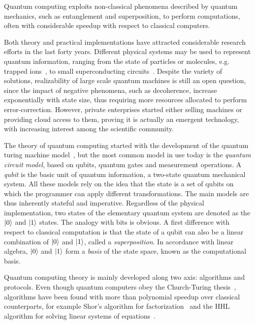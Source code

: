 Quantum computing exploits non-classical phenomena described by quantum
mechanics, such as entanglement and superposition, to perform computations,
 often with considerable speedup with respect to classical computers.

Both theory and practical implementations have attracted considerable research
efforts in the last forty years. Different physical systems may be used to represent
quantum information, ranging from the state of
particles or molecules, e.g. trapped ions~\cite{pogorelov_compact_2021}, to
small superconducting circuits~\cite{clarke_superconducting_2008}. Despite the
variety of solutions, realizability of large scale quantum machines is still an
open question, since the impact of negative phenomena, such as decoherence,
increase exponentially with state size, thus requiring more resources allocated to
perform error-correction. However, private enterprises started
either selling machines or providing cloud access to them, proving it is actually 
an emergent technology, with increasing interest among the scientific community.

The theory of quantum computing started with the development of the quantum
turing machine model~\cite{benioff_quantum_1982}, but the most common model in use today is the\textit{ quantum circuit model}, based on qubits, quantum gates and
measurement operations. A \textit{qubit} is the basic unit of quantum information, a two-state quantum mechanical system. All these models rely on the idea that the state is a set of qubits on which the programmer can apply different transformations. The main models are thus inherently stateful and imperative. 
Regardless of the physical implementation, two states of the elementary quantum system are denoted as the $\ket{0}$ and $\ket{1}$ states.
The analogy with bits is obvious. A first difference with respect to classical computation is that the state of a qubit can also be a linear combination of $\ket{0}$ and $\ket{1}$, called a \textit{superposition}. In accordance with linear algebra, $\ket{0}$ and $\ket{1}$ form a \textit{basis} of the state space, known as the computational basis. 

Quantum computing theory is mainly developed along two axis: algorithms and
protocols. Even though quantum computers obey the Church-Turing
thesis~\cite{nielsen_quantum_2010}, algorithms have been found with more
than polynomial speedup over classical counterparts, for example Shor's algorithm for
factorization~\cite{shor_algorithms_1994} and the HHL algorithm for solving
linear systems of equations~\cite{harrow_quantum_2009}.

